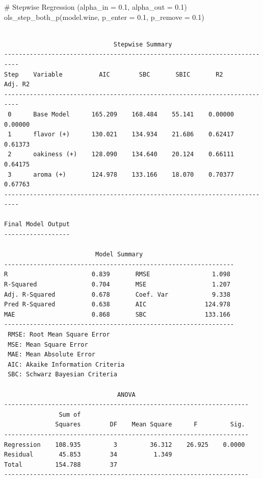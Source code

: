 \documentclass[
  letterpaper,
  DIV=11,
  numbers=noendperiod]{scrreprt}
\newenvironment{Shaded}{\begin{snugshade}}{\end{snugshade}}
\newcommand{\AttributeTok}[1]{\textcolor[rgb]{0.40,0.45,0.13}{#1}}
\newcommand{\CommentTok}[1]{\textcolor[rgb]{0.37,0.37,0.37}{#1}}
\newcommand{\FloatTok}[1]{\textcolor[rgb]{0.68,0.00,0.00}{#1}}
\newcommand{\FunctionTok}[1]{\textcolor[rgb]{0.28,0.35,0.67}{#1}}
\newcommand{\NormalTok}[1]{\textcolor[rgb]{0.00,0.23,0.31}{#1}}
\begin{document}
\begin{Shaded}
\begin{Highlighting}[]
\CommentTok{\# Stepwise Regression (alpha\_in = 0.1, alpha\_out = 0.1)}
\FunctionTok{ols\_step\_both\_p}\NormalTok{(model.wine, }\AttributeTok{p\_enter =} \FloatTok{0.1}\NormalTok{, }\AttributeTok{p\_remove =} \FloatTok{0.1}\NormalTok{)}
\end{Highlighting}
\end{Shaded}

\begin{verbatim}

                              Stepwise Summary                              
--------------------------------------------------------------------------
Step    Variable          AIC        SBC       SBIC       R2       Adj. R2 
--------------------------------------------------------------------------
 0      Base Model      165.209    168.484    55.141    0.00000    0.00000 
 1      flavor (+)      130.021    134.934    21.686    0.62417    0.61373 
 2      oakiness (+)    128.090    134.640    20.124    0.66111    0.64175 
 3      aroma (+)       124.978    133.166    18.070    0.70377    0.67763 
--------------------------------------------------------------------------

Final Model Output 
------------------

                         Model Summary                          
---------------------------------------------------------------
R                       0.839       RMSE                 1.098 
R-Squared               0.704       MSE                  1.207 
Adj. R-Squared          0.678       Coef. Var            9.338 
Pred R-Squared          0.638       AIC                124.978 
MAE                     0.868       SBC                133.166 
---------------------------------------------------------------
 RMSE: Root Mean Square Error 
 MSE: Mean Square Error 
 MAE: Mean Absolute Error 
 AIC: Akaike Information Criteria 
 SBC: Schwarz Bayesian Criteria 

                               ANOVA                                
-------------------------------------------------------------------
               Sum of                                              
              Squares        DF    Mean Square      F         Sig. 
-------------------------------------------------------------------
Regression    108.935         3         36.312    26.925    0.0000 
Residual       45.853        34          1.349                     
Total         154.788        37                                    
-------------------------------------------------------------------


\end{verbatim}
\end{document}
